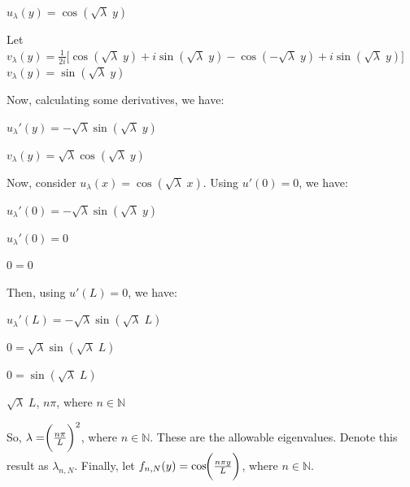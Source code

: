 \documentclass[12pt, executivepaper]{article}
\begin{document}
\begin{flushleft}
$u_{\lambda}(y)=\cos(\sqrt{\lambda} \; y)$

\vspace{3mm}

Let $v_{\lambda}(y)=\frac{1}{2i}\bigg[\cos(\sqrt{\lambda} \; y)+i\sin(\sqrt{\lambda} \; y)-\cos(-\sqrt{\lambda} \; y)+i\sin(\sqrt{\lambda} \; y)\bigg]$ \\

$v_{\lambda}(y)=\sin(\sqrt{\lambda} \; y)$

\vspace{3mm}

Now, calculating some derivatives, we have:

\begin{center}

$u_{\lambda}'(y)=-\sqrt{\lambda}\sin(\sqrt{\lambda} \; y)$

$v_{\lambda}(y)=\sqrt{\lambda}\cos(\sqrt{\lambda} \; y)$

\end{center}

\pagebreak

\vspace*{-40mm}

Now, consider $u_{\lambda}(x)=\cos(\sqrt{\lambda} \; x)$. Using $u'(0)=0$, we have:

\begin{center}

$u_{\lambda}'(0)=-\sqrt{\lambda}\sin(\sqrt{\lambda} \; y)$

$u_{\lambda}'(0)=0$

$0=0$

\end{center}

\vspace{3mm}

Then, using $u'(L)=0$, we have: 

\begin{center}

$u_{\lambda}'(L)=-\sqrt{\lambda}\sin(\sqrt{\lambda} \; L)$

$0=\sqrt{\lambda}\sin(\sqrt{\lambda} \; L)$

$0=\sin(\sqrt{\lambda} \; L)$

$\sqrt{\lambda} \; L$, $n\pi$, where $n \in \mathbb{N}$

\end{center}

\vspace{3mm}

So, $\lambda= \hspace{-1mm} \bigg(\frac{n\pi}{L}\bigg)^2$, where $n \in \mathbb{N}$. These are the allowable eigenvalues. Denote this result as $\lambda_{n,N}$. Finally, let $f_{n,N}(y)=\cos \hspace{-1mm} \bigg(\frac{n \pi y}{L}\bigg)$, where $n \in \mathbb{N}$.


\end{flushleft}
\end{document}
